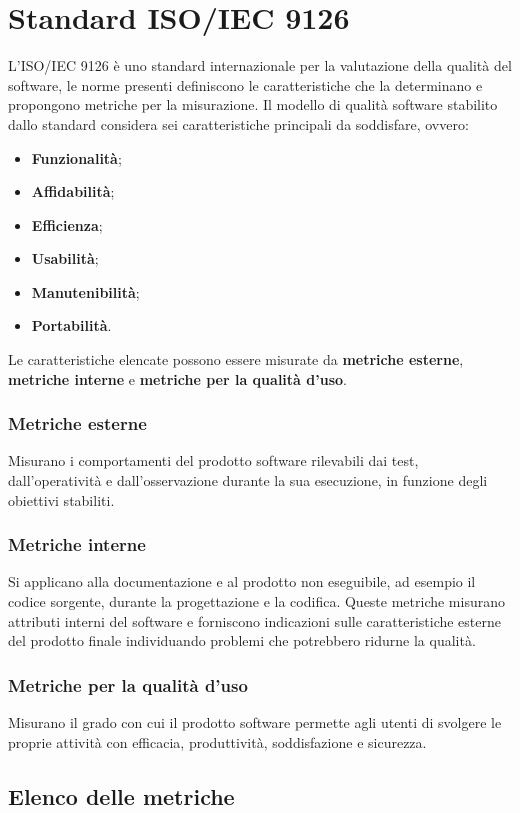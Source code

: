 \section{Standard ISO/IEC 9126}\label{9126}
L'ISO/IEC 9126 è uno standard internazionale per la valutazione della qualità del software, le norme presenti definiscono le caratteristiche che la determinano e propongono metriche per la misurazione.
Il modello di qualità software stabilito dallo standard considera sei caratteristiche principali da soddisfare, ovvero:
\begin{itemize}
	\item \textbf{Funzionalità};
	\item \textbf{Affidabilità};
	\item \textbf{Efficienza};
	\item \textbf{Usabilità};
	\item \textbf{Manutenibilità};
	\item \textbf{Portabilità}.
\end{itemize}
Le caratteristiche elencate possono essere misurate da \textbf{metriche esterne}, \textbf{metriche interne} e \textbf{metriche per la qualità d'uso}.
\subsubsection*{Metriche esterne}%
Misurano i comportamenti del prodotto software rilevabili dai test, dall'operatività e dall'osservazione durante la sua esecuzione, in funzione degli obiettivi stabiliti.
\subsubsection*{Metriche interne}
Si applicano alla documentazione e al prodotto non eseguibile, ad esempio il codice sorgente, durante la progettazione e la codifica. Queste metriche misurano attributi interni del software e forniscono indicazioni sulle caratteristiche esterne del prodotto finale individuando problemi che potrebbero ridurne la qualità.
\subsubsection*{Metriche per la qualità d'uso}
Misurano il grado con cui il prodotto software permette agli utenti di svolgere le proprie attività con efficacia, produttività, soddisfazione e sicurezza.

\subsection{Elenco delle metriche} \label{Metriche}
